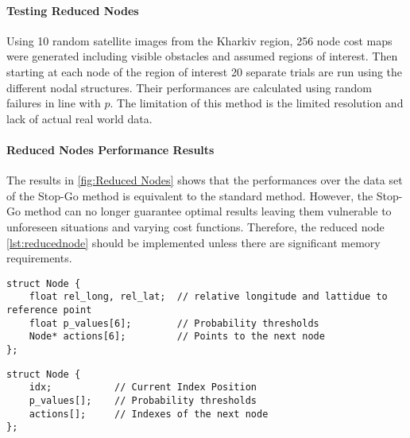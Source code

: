 \paragraph{Testing Reduced Nodes}
Using 10 random satellite images from the Kharkiv region, 256 node cost maps were generated including visible obstacles and assumed regions of interest. Then starting at each node of the region of interest 20 separate trials are run using the different nodal structures. Their performances are calculated using random failures in line with $p$. The limitation of this method is the limited resolution and lack of actual real world data.
\paragraph{Reduced Nodes Performance Results}
The results in \ref{fig:Reduced Nodes} shows that the performances over the data set of the Stop-Go method is equivalent to the standard method. However, the Stop-Go method can no longer guarantee optimal results leaving them vulnerable to unforeseen situations and varying cost functions. Therefore, the reduced node \ref{lst:reducednode} should be implemented unless there are significant memory requirements.

\begin{lstlisting}[caption={Implementated Node Structure},label={lst:node}]
struct Node {
    float rel_long, rel_lat;  // relative longitude and lattidue to reference point
    float p_values[6];        // Probability thresholds
    Node* actions[6];         // Points to the next node
};
\end{lstlisting}
\begin{lstlisting}[caption={Node Structure},label={lst:reducednode}]
struct Node {
    idx;           // Current Index Position
    p_values[];    // Probability thresholds
    actions[];     // Indexes of the next node
};
\end{lstlisting}

